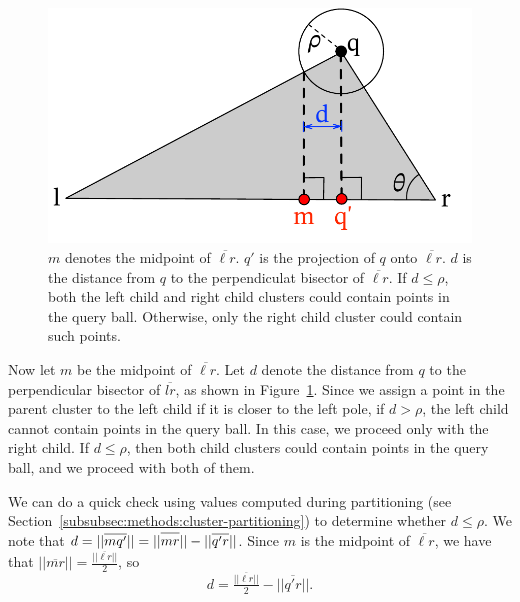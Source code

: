 \begin{figure}[ht!]
    \centering
    \includegraphics[scale=0.5]{images/geometry/overlapping-children-3.pdf}
    \caption{
        $m$ denotes the midpoint of $\overline{\ell r}$. $q'$ is the projection of $q$ onto $\overline{\ell r}$. $d$ is the distance from $q$ to the perpendiculat bisector of $\overline{\ell r}$. If $d \leq \rho$, both the left child and right child clusters could contain points in the query ball. Otherwise, only the right child cluster could contain such points. 
    }
    \label{fig:methods:overlapping-children-3}
\end{figure}

Now let $m$ be the midpoint of $\overline{\ell r}$. Let $d$ denote the distance from $q$ to the perpendicular bisector of $\overline{lr}$, as shown in Figure~\ref{fig:methods:overlapping-children-3}. Since we assign a point in the parent cluster to the left child if it is closer to the left pole, if $d > \rho$, 
the left child cannot contain points in the query ball. In this case, we proceed only with the right child. If $d \leq \rho$, 
then both child clusters could contain points in the query ball, and we proceed with both of them. 

We can do a quick check using values computed during partitioning (see Section~\ref{subsubsec:methods:cluster-partitioning}) to determine whether $d \leq \rho$. 
We note that $d = ||\overline{mq'}|| = ||\overline{mr \vphantom {q'}}||-||\overline{q'r}||$. Since $m$ is the midpoint of $\overline{\ell r}$, we have that $||\overline{mr}|| = \tfrac{||\overline{\ell r}||}{2}$, so \begin{equation} d = \tfrac{||\overline{\ell r}||}{2} - ||\overline{q'r}||.
\label{eq:methods:d-expression}
\end{equation}



